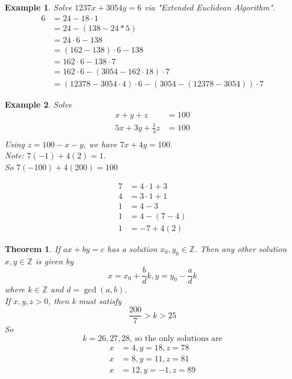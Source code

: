 \documentclass[letterpaper]{article}
\newtheorem{theorem}{Theorem}[section]
\newtheorem{example}{Example}[theorem]
\begin{document}
    \begin{example}
        Solve $1237x+3054y = 6$ via "Extended Euclidean Algorithm".
        \begin{align*}
            6 & = 24-18\cdot 1 \\
            & = 24-(138-24*5) \\
            & = 24\cdot 6 - 138 \\
            & = (162-138)\cdot 6 - 138 \\
            & = 162\cdot 6 - 138\cdot 7 \\
            & = 162\cdot 6 - (3054-162\cdot 18) \cdot 7 \\
            & = (12378-3054\cdot 4)\cdot 6 - (3054-(12378-3054))\cdot 7
        \end{align*}
    \end{example}
        
    \begin{example}
        Solve
        \begin{align*}
            x+y+z & = 100 \\
            5x+3y+\frac{1}{3}z & = 100 \\
        \end{align*}
        Using $z=100-x-y$, we have $7x+4y = 100$. \\
        Note: $7(-1) + 4(2) = 1$. \\
        So $7(-100) + 4(200) = 100$
        
        \begin{align*}
            7 & = 4\cdot 1 + 3 \\
            4 & = 3\cdot 1 + 1 \\
            1 & = 4-3 \\
            1 & = 4 - (7-4) \\
            1 & = -7 + 4(2)
        \end{align*}
    \end{example}

    \begin{theorem}
        If $ax+by=c$ has a solution $x_0,y_0\in\mathbb{Z}$. Then any other solution
        $x,y\in\mathbb{Z}$ is given by 
        \[
            x=x_0 + \frac{b}{d}k, y = y_0-\frac{a}{d}k        
        \]
        where $k\in\mathbb{Z}$ and $d=\gcd(a,b)$. \\
        If $x,y,z >0$, then k must satisfy
        \[
            \frac{200}{7} > k > 25
        \]
        So
        \[
            k = 26,27,28 \text{, so the only solutions are}
        \]
        \begin{align*}
            x & = 4, y = 18, z = 78 \\
            x & = 8, y = 11, z = 81 \\
            x & = 12, y = -1, z = 89
        \end{align*}
        
    \end{theorem}
\end{document}

